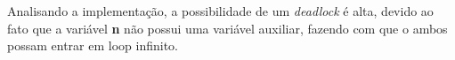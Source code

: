 \begin{question}

	Analisando a implementação, a possibilidade de um 
	\emph{deadlock} é alta, devido ao fato que a variável \textbf{n}
	não possui uma variável auxiliar, fazendo com que o ambos
	possam entrar em loop infinito.
	
\end{question}
